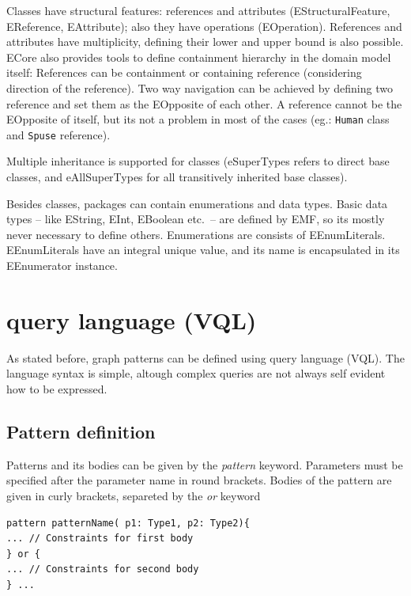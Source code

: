 Classes have structural features: references and attributes (EStructuralFeature, EReference, EAttribute); also they have operations (EOperation).
References and attributes have multiplicity, defining their lower and upper bound is also possible.
ECore also provides tools to define containment hierarchy in the domain model itself: References can be containment or containing reference (considering direction of the reference). 
Two way navigation can be achieved by defining two reference and set them as the EOpposite of each other. A reference cannot be the EOpposite of itself, but its not a problem in most of the cases (eg.: \texttt{Human} class and \texttt{Spuse} reference). 

Multiple inheritance is supported for classes (eSuperTypes refers to direct base classes, and eAllSuperTypes for all transitively inherited base classes).

Besides classes, packages can contain enumerations and data types. 
Basic data types -- like EString, EInt, EBoolean etc.\ -- are defined by EMF, so its mostly never necessary to define others.
Enumerations are consists of EEnumLiterals. 
EEnumLiterals have an integral unique value, and its name is encapsulated in its EEnumerator instance.



	

\section{\viatra{} query language (VQL)}

As stated before, graph patterns can be defined using \viatra{} query language (VQL). 
The language syntax is simple, altough complex queries are not always self evident how to be expressed.

\subsection{Pattern definition}
Patterns and its bodies can be given by the \emph{pattern} keyword. 
Parameters must be specified after the parameter name in round brackets. 
Bodies of the pattern are given in curly brackets, separeted by the \emph{or} keyword

\begin{minipage}{\textwidth}
\begin{lstlisting}[language=vql]
pattern patternName( p1: Type1, p2: Type2){
... // Constraints for first body
} or {
... // Constraints for second body
} ...
\end{lstlisting}
\end{minipage}


